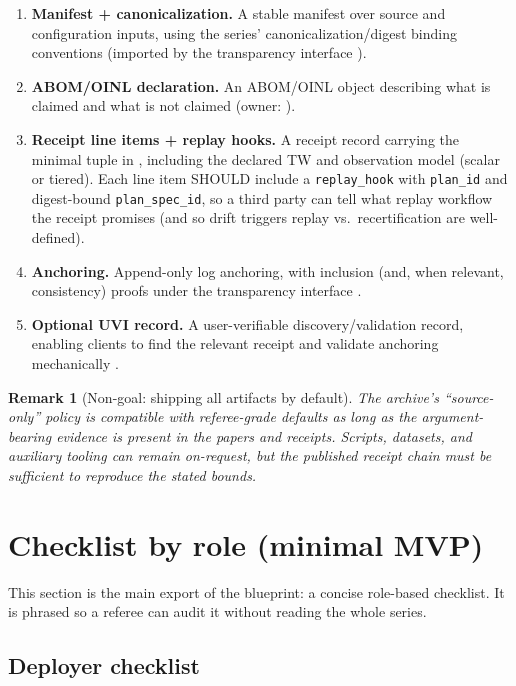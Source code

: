 \documentclass[11pt]{article}
\newtheorem{remark}{Remark}
\begin{document}
\begin{enumerate}[leftmargin=*]
\item \textbf{Manifest + canonicalization.} A stable manifest over source and configuration inputs, using the series' canonicalization/digest binding conventions (imported by the transparency interface \cite{series:transparency}).
\item \textbf{ABOM/OINL declaration.} An ABOM/OINL object describing what is claimed and what is not claimed (owner: \cite{series:abomoinl}).
\item \textbf{Receipt line items + replay hooks.} A receipt record carrying the minimal tuple in \cite{series:receiptitems}, including the declared TW and observation model (scalar or tiered). Each line item SHOULD include a \texttt{replay\_hook} with \texttt{plan\_id} and digest-bound \texttt{plan\_spec\_id}, so a third party can tell what replay workflow the receipt promises (and so drift triggers replay vs.\ recertification are well-defined).\cite{series:planstateequiv}
\item \textbf{Anchoring.} Append-only log anchoring, with inclusion (and, when relevant, consistency) proofs under the transparency interface \cite{series:transparency}.
\item \textbf{Optional UVI record.} A user-verifiable discovery/validation record, enabling clients to find the relevant receipt and validate anchoring mechanically \cite{series:userminiface}.
\end{enumerate}

\begin{remark}[Non-goal: shipping all artifacts by default]
The archive's ``source-only'' policy is compatible with referee-grade defaults as long as the \emph{argument-bearing evidence} is present in the papers and receipts.
Scripts, datasets, and auxiliary tooling can remain on-request, but the published receipt chain must be sufficient to reproduce the stated bounds.
\end{remark}

\section{Checklist by role (minimal MVP)}

This section is the main export of the blueprint: a concise role-based checklist.
It is phrased so a referee can audit it without reading the whole series.

\subsection{Deployer checklist}
\end{document}

